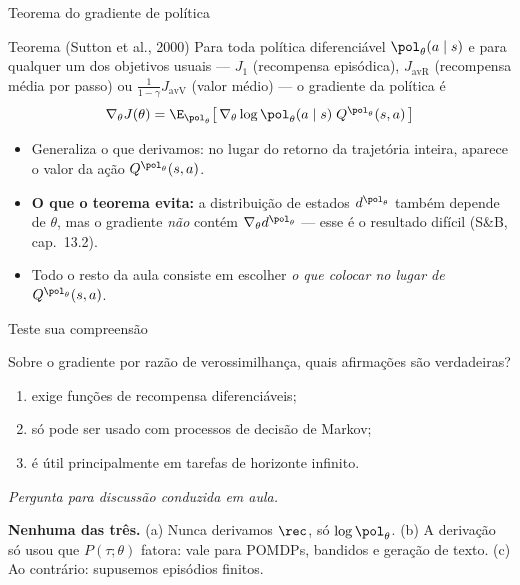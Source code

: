 \documentclass[aspectratio=169, 11pt]{beamer}
\newcommand{\paradiscussao}{\smallskip
  {\footnotesize\color{rlCinza}\itshape Pergunta para discussão conduzida em aula.}}
\newcommand{\thv}{\theta}                       %
\newcommand{\polth}{\pol_{\thv}}                %
\newcommand{\gth}{\nabla_{\thv}}                %
\newcommand{\traj}{\tau}                        %
\newcommand{\Ptraj}{P(\traj;\thv)}
\newcommand{\gscore}{\gth \log \polth(a \mid s)} %
\begin{document}
\begin{frame}{Teorema do gradiente de política}

  \begin{teobox}{Teorema \textnormal{(Sutton et al., 2000)}}
    Para toda política diferenciável $\polth(a\mid s)$ e para qualquer um dos
    objetivos usuais --- $J_1$ (recompensa episódica), $J_{\text{avR}}$
    (recompensa média por passo) ou $\tfrac{1}{1-\gamma}J_{\text{avV}}$ (valor
    médio) --- o gradiente da política é
    \[
      \gth J(\thv) = \E_{\polth}\bigl[\, \gscore\; Q^{\polth}(s,a) \,\bigr]
    \]
  \end{teobox}

  \begin{itemize}\setlength{\itemsep}{0.35ex}
    \item Generaliza o que derivamos: no lugar do retorno da trajetória
      inteira, aparece o valor da ação $Q^{\polth}(s,a)$.
    \item \textbf{O que o teorema evita:} a distribuição de estados
      $d^{\polth}$ também depende de $\thv$, mas o gradiente \emph{não} contém
      $\gth d^{\polth}$ --- esse é o resultado difícil (S\&B, cap.\ 13.2).
    \item Todo o resto da aula consiste em escolher \emph{o que colocar no
      lugar de $Q^{\polth}(s,a)$}.
  \end{itemize}
\end{frame}

\begin{frame}{Teste sua compreensão}

  \begin{quizbox}{}
    Sobre o gradiente por razão de verossimilhança, quais afirmações são
    verdadeiras?
    \begin{enumerate}\setlength{\itemsep}{0.1ex}
      \item[(a)] exige funções de recompensa diferenciáveis;
      \item[(b)] só pode ser usado com processos de decisão de Markov;
      \item[(c)] é útil principalmente em tarefas de horizonte infinito.
    \end{enumerate}
    \paradiscussao
  \end{quizbox}

  \pause
  \vspace{-0.3em}
  \begin{respbox}
    \textbf{Nenhuma das três.} (a) Nunca derivamos $\rec$, só $\log\polth$.
    (b) A derivação só usou que $\Ptraj$ fatora: vale para POMDPs, bandidos e
    geração de texto. (c) Ao contrário: supusemos episódios finitos.
  \end{respbox}
\end{frame}
\end{document}
